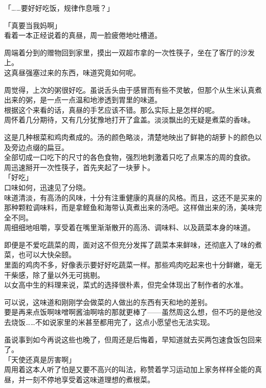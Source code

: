 「……要好好吃饭，规律作息哦？」

「真要当我妈啊」\\

看着一本正经说着的真昼，周一脸疲倦地吐槽道。\\

\vspace{2\baselineskip}

周端着分到的赠物回到家里，摸出一双超市拿的一次性筷子，坐在了客厅的沙发上。\\

这真昼强塞过来的东西，味道究竟如何呢。

周觉得，上次的粥很好吃。虽说舌头由于感冒而有些不灵敏，但那个从生米认真煮出来的粥，是一点一点温和地渗透到胃里的味道。\\

根据这个来看的话，真昼的手艺应该不错。那么实际上是怎样的呢。\\

周怀着几分期待，又有几分犹豫地打开了盒盖。淡淡飘出的无疑是煮菜的香味。

这是几种根菜和鸡肉煮成的。汤的颜色略淡，清楚地映出了鲜艳的胡萝卜的颜色以及旁边点缀的扁豆。\\

全部切成一口吃下的尺寸的各色食物，强烈地刺激着只吃了点果冻的周的食欲。\\

周迅速掰开一次性筷子，首先夹起了一块萝卜。\\

「好吃」\\

口味如何，迅速见了分晓。\\

味道清淡，有高汤的风味，十分有注重健康的真昼的风格。而且，这还不是买来的那种颗粒调味料，而是拿鲣鱼和海带认真煮出来的汤吧。这样做出来的汤，美味完全不同。\\

周细细地咀嚼，享受着在嘴里渐渐散开的高汤、调味料、以及蔬菜本身的味道。

即便是不爱吃蔬菜的周，面对这不但充分发挥了蔬菜本来鲜味，还彻底入了味的煮菜，也可以大快朵颐。\\

里面的鸡肉不多，好像表示要好好吃蔬菜一样。那些鸡肉吃起来也十分鲜嫩，毫无干柴感，除了量以外无可挑剔。\\

以女高中生的料理来说，菜式的选择很朴素，但完全体现出了制作者的水准。

可以说，这味道和刚刚学会做菜的人做出的东西有天和地的差别。\\

要是再来点饭啊味噌啊酱油啊啥的那就更棒了——虽然周这么想，但不巧的是他没去烧饭……不如说家里的米甚至都用完了，这点小愿望也无法实现。

虽说事到如今再说这些也晚了，但周还是后悔着，早知道就去买两包速食饭包回来了。\\

「天使还真是厉害啊」\\

周用着这本人听了怕是又要不高兴的叫法，称赞着学习运动加上家务样样全能的真昼，并一刻不停地享受着这味道理想的煮根菜。
